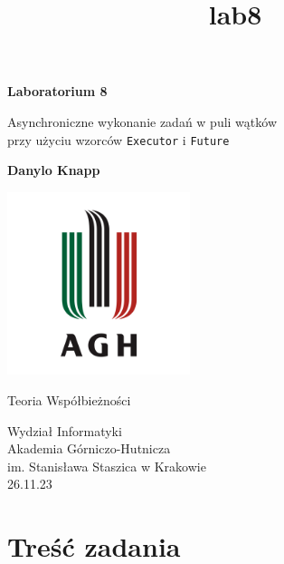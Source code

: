 \documentclass[11pt]{article}
\title{lab8}
\begin{document}
    
    \begin{titlepage}
        \begin{center}
            \vspace*{1cm}
    
            \textbf{Laboratorium 8}
    
            \vspace{0.5cm}
            Asynchroniczne wykonanie zadań w puli wątków\\
            przy użyciu wzorców \texttt{Executor} i \texttt{Future}
                
            \vspace{1.5cm}
    
            \textbf{Danylo Knapp}

            \vfill

            \includegraphics[width=0.4\textwidth]{../report-templates/agh-logo.png}
    
            \vfill
                
            Teoria Współbieżności
                
            \vspace{0.8cm}

            Wydział Informatyki\\
            Akademia Górniczo-Hutnicza\\
            im. Stanisława Staszica w Krakowie\\
            26.11.23
                
        \end{center}
    \end{titlepage}
    
    

    
    \hypertarget{treux15bux107-zadania}{%
\section{Treść zadania}\label{treux15bux107-zadania}}
\end{document}
